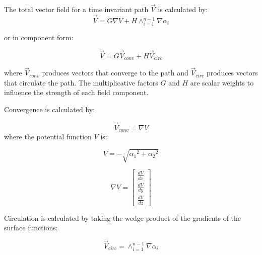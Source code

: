 \documentclass[conf]{new-aiaa}
\begin{document}



\noindent
The total vector field for a time invariant path $\overrightarrow{V}$ is calculated by:
\begin{equation}\label{eq:GVF}
\overrightarrow{V} = G \nabla V + H \wedge_{i=1}^{n-1}\nabla\alpha_i
\end{equation}

\noindent
or in component form:

\begin{equation}\label{eq:simpleGVF}
\overrightarrow{V} = G\overrightarrow{V}_{conv} + H\overrightarrow{V}_{circ} 
\end{equation}	

\noindent
where $\overrightarrow{V}_{conv}$ produces vectors that converge to the path and $\overrightarrow{V}_{circ}$ produces vectors that circulate the path. The multiplicative factors $G$ and $H$ are scalar weights to influence the strength of each field component.

\noindent
Convergence is calculated by:

\begin{equation}
\overrightarrow{V}_{conv} = \nabla V  
\label{convOnly}
\end{equation}
\noindent
where the potential function $V$ is:

\begin{equation}
V = -\sqrt{{\alpha_1}^2 + {\alpha_2}^2}
\end{equation}

\begin{equation}
\label{eq:gradV}
\nabla V =\begin{bmatrix}
\frac{dV}{dx} \\
\frac{dV}{dy} \\
\frac{dV}{dz}
\end{bmatrix}
\end{equation}


\noindent
Circulation is calculated by taking the wedge product of the gradients of the surface functions:

\begin{equation}
\overrightarrow{V}_{circ} =  \wedge_{i=1}^{n-1}\nabla\alpha_i 
\label{circOnly}
\end{equation}
\end{document}
